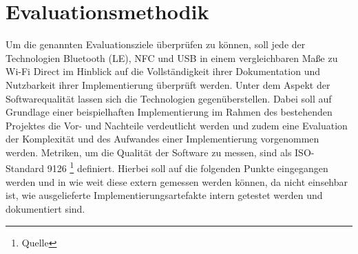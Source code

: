 \documentclass[12pt,a4paper]{article}
\begin{document}
    \section{Evaluationsmethodik}
    	Um die genannten Evaluationsziele überprüfen zu können, soll jede der Technologien Bluetooth (LE), NFC und USB in einem vergleichbaren Maße zu Wi-Fi Direct im Hinblick auf die Vollständigkeit ihrer Dokumentation und Nutzbarkeit ihrer Implementierung überprüft werden.
    	Unter dem Aspekt der Softwarequalität lassen sich die Technologien gegenüberstellen. Dabei soll auf Grundlage einer beispielhaften Implementierung im Rahmen des bestehenden Projektes die Vor- und Nachteile verdeutlicht werden und zudem eine Evaluation der Komplexität und des Aufwandes einer Implementierung vorgenommen werden. Metriken, um die Qualität der Software zu messen, sind als ISO-Standard 9126 \footnote{Quelle} definiert. Hierbei soll auf die folgenden Punkte eingegangen werden und in wie weit diese extern gemessen werden können, da nicht einsehbar ist, wie ausgelieferte Implementierungsartefakte intern getestet werden und dokumentiert sind.
\end{document}
